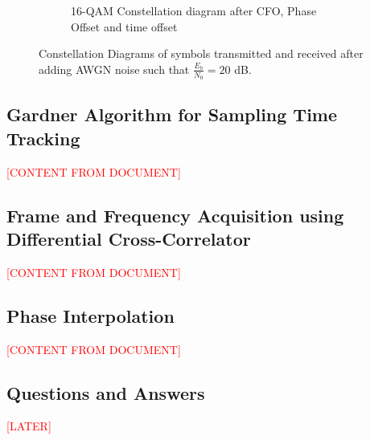 \begin{figure}[H]
\begin{subfigure}[b]{0.48\textwidth}
		\caption{16-QAM Constellation diagram after CFO, Phase Offset and time offset}
		\label{fig:cfo-po-to-sub}
	\end{subfigure}
	\caption{Constellation Diagrams of symbols transmitted and received after adding AWGN noise such that $\frac{E_b}{N_0} = 20$ dB.}
	\label{fig:cfo-combined}
\end{figure}


\subsection{Gardner Algorithm for Sampling Time Tracking}
\textcolor{red}{[CONTENT FROM DOCUMENT]}
\subsection{Frame and Frequency Acquisition using Differential Cross-Correlator}
\textcolor{red}{[CONTENT FROM DOCUMENT]}
\subsection{Phase Interpolation}
\textcolor{red}{[CONTENT FROM DOCUMENT]}
\subsection{Questions and Answers}
\textcolor{red}{[LATER]}